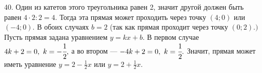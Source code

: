 40. Один из катетов этого треугольника равен 2, значит другой должен быть равен $4\cdot2:2=4.$ Тогда эта прямая может проходить через точку $(4;0)$ или $(-4;0).$ В обоих случаях $b=2$ (так как прямая проходит через точку $(0;2).)$ Пусть прямая задана уравнением $y=kx+b.$ В первом случае $4k+2=0,\ k=-\cfrac{1}{2},$ а во втором --- $-4k+2=0,\ k=\cfrac{1}{2}.$ Значит, прямая может иметь уравнение $y=2-\frac{1}{2}x$ или $y=2+\frac{1}{2}x.$\\
